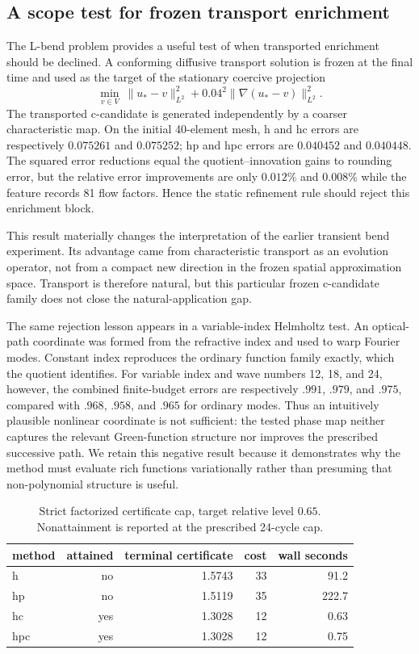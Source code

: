 \documentclass[11pt]{article}
\numberwithin{algorithm}{section}
\theoremstyle{definition}\newtheorem{definition}[theorem]{Definition}
\theoremstyle{remark}\newtheorem{remark}[theorem]{Remark}
\begin{document}
\secondarynumericsB
\subsection{A scope test for frozen transport enrichment}
The L-bend problem provides a useful test of when transported enrichment
should be declined.  A conforming diffusive transport solution is frozen at
the final time and used as the target of the stationary coercive projection
\[
 \min_{v\in V}\ \|u_* -v\|_{L^2}^2
       +0.04^2\|\nabla(u_*-v)\|_{L^2}^2.
\]
The transported c-candidate is generated independently by a coarser characteristic map.
On the initial 40-element mesh, h and hc errors are respectively $0.075261$
and $0.075252$; hp and hpc errors are $0.040452$ and $0.040448$.  The squared
error reductions equal the quotient--innovation gains to rounding error, but
the relative error improvements are only $0.012\%$ and $0.008\%$ while the
feature records 81 flow factors.  Hence the static refinement rule should reject
this enrichment block.

This result materially changes the interpretation of the earlier transient
bend experiment.  Its advantage came from characteristic transport as an
evolution operator, not from a compact new direction in the frozen spatial
approximation space.  Transport is therefore natural, but this particular
frozen c-candidate family does not close the natural-application gap.

The same rejection lesson appears in a variable-index Helmholtz test.  An
optical-path coordinate was formed from the refractive index and used to warp
Fourier modes.  Constant index reproduces the ordinary function family exactly,
which the quotient identifies.  For variable index and wave numbers 12, 18,
and 24, however, the combined finite-budget errors are respectively $.991$,
$.979$, and $.975$, compared with $.968$, $.958$, and $.965$ for ordinary
modes.  Thus an intuitively plausible nonlinear coordinate is not sufficient:
the tested phase map neither captures the relevant Green-function structure
nor improves the prescribed successive path.  We retain this negative result because
it demonstrates why the method must evaluate rich functions variationally
rather than presuming that non-polynomial structure is useful.

\begin{table}[h]
\centering
\caption{Strict factorized certificate cap, target relative level $0.65$.
Nonattainment is reported at the prescribed 24-cycle cap.}
\label{tab:factorized-cycle-cap}
\begin{tabular}{lrrrr}
\toprule
method & attained & terminal certificate & cost & wall seconds\\
\midrule
h   & no  & 1.5743 & 33 & 91.2\\
hp  & no  & 1.5119 & 35 & 222.7\\
hc  & yes & 1.3028 & 12 & 0.63\\
hpc & yes & 1.3028 & 12 & 0.75\\
\bottomrule
\end{tabular}
\end{table}
\end{document}
